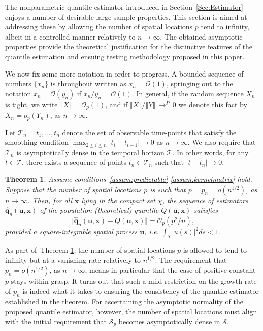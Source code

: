 \documentclass[aos]{imsart}
\theoremstyle{plain}
\newtheorem{theorem}{Theorem}[section]
\theoremstyle{remark}
\newcommand{\Scal}{\mathcal{S}}
\newcommand{\Tcal}{\mathcal{T}}
\newcommand{\norm}[1]{\left\Vert #1 \right\Vert}
\newcommand{\bb}[1]{\boldsymbol{#1}}
\newcommand{\conv}[1]{\ensuremath{\, \displaystyle {\mathop {\longrightarrow}^{#1}}}\, }
\newcommand{\cnam}[1]{\textcolor{mypurple}{#1}}
\begin{document}
The nonparametric quantile estimator introduced in Section~\ref{Sec:Estimator} enjoys a number of  desirable  large-sample properties. This section is aimed at addressing these by allowing the \cnam{number of spatial locations $p$ tend to infinity, albeit in a controlled manner relatively to $n \rightarrow \infty$. The obtained} asymptotic properties provide the theoretical justification for the distinctive features of the quantile estimation \cnam{and ensuing testing methodology} proposed in this paper.

\cnam{We now fix some more notation in order to progress.} A bounded sequence of numbers $\{x_n\}$ is throughout written as $x_n=\mathcal{O}(1)$, springing out to the notation $x_n= \mathcal{O}(y_n)$ if $x_n/y_n= \mathcal{O}(1)$. In general, if the random sequence $X_n$ is tight, we write $\norm{X} = \mathcal{O}_p(1)$, and if $\norm{X}/\norm{Y} \conv{P} 0$ we denote this fact by $X_n= o_p(Y_n)$, as $n \rightarrow \infty$.

Let $\Tcal_n = {t_1, \dots, t_n}$ denote the set of observable time-points that satisfy the smoothing condition $\max_{2\leqslant i \leqslant n} \vert t_i - t_{i-1}\vert \rightarrow 0$ as $n \rightarrow \infty$. We also require that $\Tcal_n$ is asymptotically dense in the temporal horizon $\Tcal$. In other words, for any $\tilde{t} \in \Tcal$, there exists a sequence of points $\tilde{t}_n \in \Tcal_n$ such that $\vert \tilde{t} - \tilde{t}_n\vert \rightarrow 0$.

\begin{theorem}\label{thm:consistency}
    Assume conditions~\ref{assum:predictable}-\ref{assum:kernelmatrix} hold. \cnam{Suppose that the number of spatial locations $p$ is such that $p=p_n = o(n^{1/2})$, as $n \rightarrow \infty$.} Then, for all $\bb{x}$ lying in the compact set $\chi$, the sequence of estimators $\widehat{\bb{q}}_n(\bb{u}, \bb{x})$ of the population (theoretical) quantile $Q(\bb{u}, \bb{x})$ \cnam{satisfies}
    \begin{equation}\label{eqn:consistency}
        \Vert \widehat{\bb{q}}_n(\bb{u}, \bb{x}) - Q(\bb{u}, \bb{x}) \Vert = \mathcal{O}_p(p^2/n),
    \end{equation}
    \cnam{provided a} square-integrable spatial process $\bb{u}$, i.e.  $\int_{\Scal} \vert u(s)\vert^2 ds < 1$.
\end{theorem}

\cnam{As part of~Theorem \ref{thm:consistency}, the number of spatial locations $p$ is allowed to tend to infinity but at a vanishing rate relatively to $n^{1/2}$. The requirement that $p_n = o(n^{1/2})$, as $n\rightarrow \infty$, means in particular that the case of positive constant $p$ stays within grasp. It turns out that such a mild restriction on the growth rate of $p_n$ is indeed what it takes to ensuring the consistency of the quantile estimator established in the theorem.
For ascertaining the asymptotic normality of the proposed quantile estimator, however, the number of spatial locations must align with the initial requirement that $\Scal_p$ becomes asymptotically dense in $\Scal$.}
\end{document}
